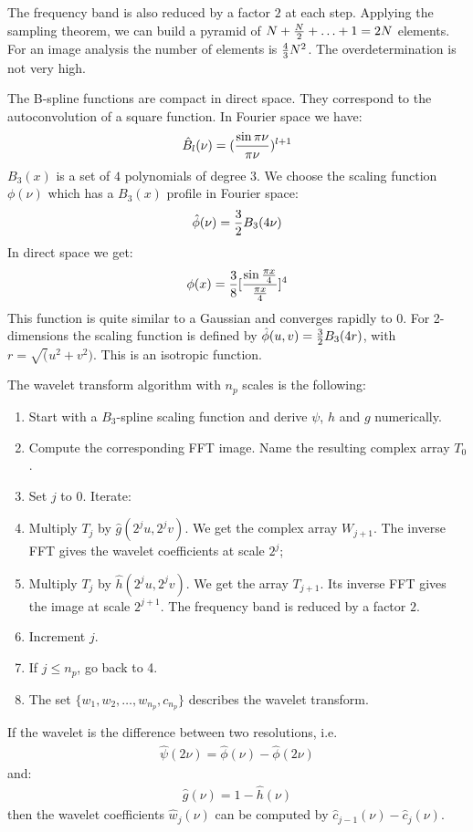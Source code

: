 The frequency band is also reduced by a factor $2$ at each step.
Applying the sampling theorem, we can build a pyramid  of
 $N+{N\over 2}+\ldots+1=2N$ elements.
For an image analysis the number of elements is ${4\over 3}N^2$. The
overdetermination is not very high.

The B-spline functions are compact in direct space. They
correspond to the autoconvolution of a square function. In
Fourier space we have:
\begin{eqnarray}
\hat B_l(\nu)=({\sin\pi\nu\over\pi\nu})^{l+1}
\end{eqnarray}
$B_3(x)$ is a set of $4$ polynomials of degree $3$.
We choose the scaling function $\phi(\nu)$ which has a
$B_3(x)$ profile in Fourier space:
\begin{eqnarray}
\hat{\phi}(\nu)={3\over 2}B_3(4\nu)
\end{eqnarray}
In direct space we get:
\begin{eqnarray}
\phi(x)={3\over 8}[{\sin{\pi x\over 4}\over {\pi x\over
4}}]^4
\end{eqnarray}
This function is quite similar to a Gaussian and converges
rapidly to $0$. For 2-dimensions the scaling function is defined by
$\hat \phi(u,v) = {3\over 2}B_3(4r)$, with $r = \sqrt(u^2+v^2)$.
This is an isotropic function.

The wavelet transform algorithm with $n_p$ scales is the following:
\begin{enumerate}
\item Start with a $B_3$-spline scaling function and derive $\psi$, $h$ and
$g$ numerically.
\item Compute the corresponding FFT image. 
Name the resulting complex array $T_0$.
\item Set $j$ to $0$. Iterate:
\item Multiply  $T_j$ by $\hat g(2^ju,2^jv)$. We get the complex array
$W_{j+1}$. The inverse FFT
gives the wavelet coefficients at scale $2^j$;
\item Multiply  $T_j$ by $\hat h(2^ju,2^jv)$. We get the array
$T_{j+1}$. Its inverse FFT gives the image at scale $2^{j+1}$.
The frequency band is reduced by a factor $2$.
\item Increment $j$.
\item If $j \leq  n_p$, go back to 4.
\item The set $\{w_1, w_2, \dots, w_{n_p}, c_{n_p}\}$ describes the
wavelet transform.
\end{enumerate}
If the wavelet is the difference between two resolutions, i.e.
\begin{eqnarray}
\hat \psi(2\nu) = \hat \phi(\nu) - \hat \phi(2\nu)
\end{eqnarray}
and:
\begin{eqnarray}
\hat g(\nu) = 1 - \hat h(\nu)
\end{eqnarray}
then the wavelet coefficients $\hat w_j(\nu)$ can be computed by 
$\hat c_{j-1}(\nu) - \hat c_j(\nu)$.

